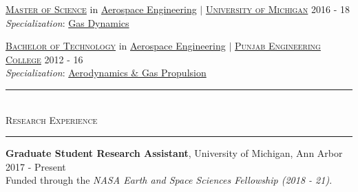 \documentclass[10pt]{article}
\begin{document}



\vspace{-1em}
\href{https://aero.engin.umich.edu/academics/graduate/mse/}{\textsc{Master of Science}} in \href{https://aero.engin.umich.edu/}{Aerospace Engineering} $|$ \textsc{{\href{http://umich.edu/}{ {University of Michigan}}}} \hfill {2016 - 18}\\ 
\emph{Specialization}: \href{https://aero.engin.umich.edu/research/areas/gas/}{Gas Dynamics} %

\vspace{0.25em}
\href{http://www.pec.ac.in/programmes/ug/structure}{\textsc{Bachelor of Technology}} in \href{http://www.pec.ac.in/aero}{Aerospace Engineering} $|$ \href{http://www.pec.ac.in/}{\textsc{{Punjab Engineering College}}} \hfill {2012 - 16} \\
\emph{Specialization}: \href{http://www.pec.ac.in/aero/peo}{Aerodynamics \& Gas Propulsion}

\vspace{-1em}


\begin{center}
{\noindent\rule[0.5ex]{\linewidth}{0.5pt}\\
\vspace{-0.5em}\large{\textsc{Research Experience}}
\\ \vspace{-0.25em}
\noindent\rule[0.5ex]{\linewidth}{0.5pt}}
\end{center}

\vspace{-1em}
\textbf{Graduate Student Research Assistant}, {{University of Michigan, Ann Arbor}} \hfill \normalsize{2017 - Present}\\ 
Funded through the \emph{NASA Earth and Space Sciences Fellowship (2018 - 21)}.
\end{document}
